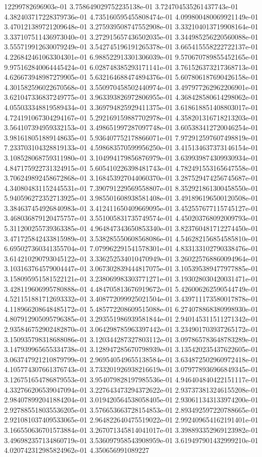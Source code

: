 12299782696903e-01	3.758649029752235138e-01	3.724704535261437743e-01	4.382403717228379736e-01	4.735160595455808474e-01	4.099800480069921149e-01	3.470121389721209648e-01	3.275939508747552908e-01	3.332104013719908164e-01	3.337107511436973040e-01	3.272915657436502035e-01	3.344985256220560088e-01	3.555719912630079249e-01	3.542745196191265378e-01	3.665415558222722137e-01	4.226842461063304301e-01	6.988522913301306039e-01	9.570670789855452165e-01	9.975162840064445424e-01	6.028748385293171141e-01	3.761526373217368713e-01	4.626673948987279905e-01	5.632164688474894376e-01	5.607806187690426158e-01	4.301582596022670568e-01	3.550970458502440974e-01	3.497977262962206901e-01	3.621047336837249775e-01	3.963393826972806955e-01	4.368428580614298062e-01	4.055033348819589434e-01	3.369794825929411375e-01	3.618618851408803017e-01	4.724191067304294167e-01	5.292169159887702978e-01	4.358201316718213203e-01	3.564107394959332153e-01	3.498651997287097748e-01	3.605383412720046254e-01	3.981618051889148635e-01	5.936407752178866071e-01	7.972912597607498819e-01	7.233703104328819133e-01	4.598683570599956250e-01	3.415134637373146154e-01	3.108528068759311980e-01	3.104994179856876979e-01	3.639939874309930934e-01	4.847175922731324915e-01	5.605410226398481743e-01	4.782491553165647558e-01	3.706249892458672868e-01	3.168453927044060370e-01	3.287529474256745687e-01	4.340804831152445531e-01	7.390791229569558807e-01	8.352921861300458550e-01	5.940596272352713925e-01	3.985501608938581408e-01	3.491896196500120508e-01	3.384637454926840983e-01	3.412411650409669095e-01	3.452557677115745127e-01	3.468036879120475757e-01	3.551005831735749574e-01	4.450203768092009793e-01	5.311200255739363385e-01	4.964847343650853340e-01	3.823760481712274450e-01	3.471725842433815989e-01	3.538285550608568086e-01	4.546282156854585810e-01	6.695027360341355704e-01	7.079962291541578301e-01	4.833133102790338476e-01	3.614210290793045122e-01	3.336252534010470949e-01	3.260225768860094964e-01	3.103163764579004447e-01	3.067302839444817075e-01	3.105395389477977885e-01	3.158095951581522121e-01	3.238069983303771271e-01	3.193028030420031471e-01	3.428119606995780888e-01	4.484705813676919672e-01	5.426006262590544749e-01	4.521151881712693332e-01	3.408772099925021504e-01	3.439711173580017878e-01	4.118966208648485172e-01	5.485772208609515088e-01	6.274078868380998930e-01	4.807912905095796385e-01	3.293551986939581844e-01	2.940145311511271342e-01	2.935846752902482870e-01	3.064298785963397442e-01	3.234901703937265172e-01	3.150935798318688086e-01	3.120344287327803112e-01	3.097865783648783289e-01	3.147939965655334738e-01	3.128947285670798939e-01	3.135420235437622605e-01	3.063747921210879799e-01	2.969540549655138584e-01	3.634872502960972418e-01	4.105774307661376743e-01	3.733201926938216619e-01	3.079778936966849345e-01	3.126751654786879553e-01	3.954079828197985536e-01	4.946404840422151117e-01	4.332766206539047094e-01	3.227643473294372622e-01	2.937373813246155208e-01	2.984078992041884204e-01	3.019420564538058405e-01	2.930611343133974200e-01	2.927885518035536205e-01	3.576653663728154853e-01	2.893492597220788665e-01	2.921081037409533065e-01	2.964822640475519022e-01	2.992409654162191401e-01	3.166550636701573884e-01	3.267071345814041017e-01	3.398893352969123982e-01	3.496982357134860719e-01	3.536097958543908959e-01	3.619497901432999210e-01	4.020742312985824962e-01	4.350656991089227